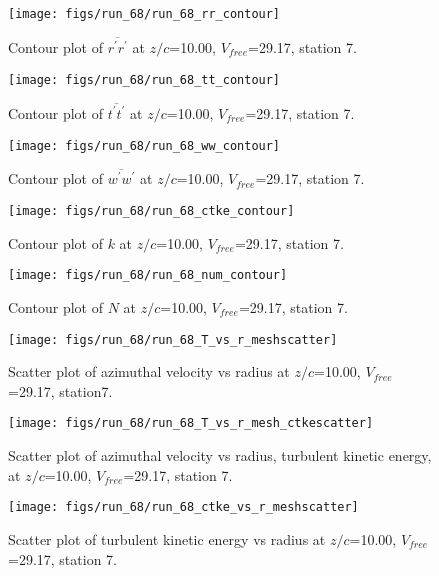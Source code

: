 \begin{figure}[H]
\centering
\texttt{[image: figs/run\_68/run\_68\_rr\_contour]}
\caption{Contour plot of $\overline{r^\prime r^\prime}$ at $z/c$=10.00, $V_{free}$=29.17, station 7.}
\label{fig:run_68_rr_contour}
\end{figure}


\begin{figure}[H]
\centering
\texttt{[image: figs/run\_68/run\_68\_tt\_contour]}
\caption{Contour plot of $\overline{t^\prime t^\prime}$ at $z/c$=10.00, $V_{free}$=29.17, station 7.}
\label{fig:run_68_tt_contour}
\end{figure}


\begin{figure}[H]
\centering
\texttt{[image: figs/run\_68/run\_68\_ww\_contour]}
\caption{Contour plot of $\overline{w^\prime w^\prime}$ at $z/c$=10.00, $V_{free}$=29.17, station 7.}
\label{fig:run_68_ww_contour}
\end{figure}


\begin{figure}[H]
\centering
\texttt{[image: figs/run\_68/run\_68\_ctke\_contour]}
\caption{Contour plot of $k$ at $z/c$=10.00, $V_{free}$=29.17, station 7.}
\label{fig:run_68_ctke_contour}
\end{figure}


\begin{figure}[H]
\centering
\texttt{[image: figs/run\_68/run\_68\_num\_contour]}
\caption{Contour plot of $N$ at $z/c$=10.00, $V_{free}$=29.17, station 7.}
\label{fig:run_68_num_contour}
\end{figure}


\begin{figure}[H]
\centering
\texttt{[image: figs/run\_68/run\_68\_T\_vs\_r\_meshscatter]}
\caption{Scatter plot of azimuthal velocity vs radius at $z/c$=10.00, $V_{free}$=29.17, station7.}
\label{fig:run_68_T_vs_r_meshscatter}
\end{figure}


\begin{figure}[H]
\centering
\texttt{[image: figs/run\_68/run\_68\_T\_vs\_r\_mesh\_ctkescatter]}
\caption{Scatter plot of azimuthal velocity vs radius, turbulent kinetic energy, at $z/c$=10.00, $V_{free}$=29.17, station 7.}
\label{fig:run_68_T_vs_r_mesh_ctkescatter}
\end{figure}


\begin{figure}[H]
\centering
\texttt{[image: figs/run\_68/run\_68\_ctke\_vs\_r\_meshscatter]}
\caption{Scatter plot of turbulent kinetic energy vs radius at $z/c$=10.00, $V_{free}$=29.17, station 7.}
\label{fig:run_68_ctke_vs_r_meshscatter}
\end{figure}


